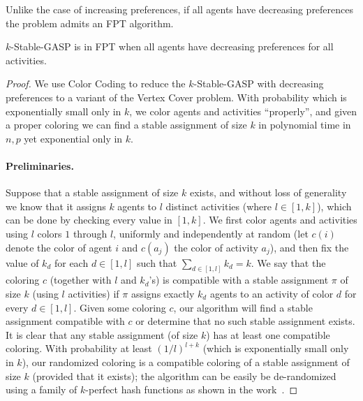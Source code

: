 Unlike the case of increasing preferences, if all agents have decreasing preferences the problem admits an FPT algorithm. 

\begin{theorem} \label{GASP:thm:stable_fpt_dec}
$k$-Stable-GASP is in FPT when all agents have decreasing preferences for all activities.
\end{theorem}
\begin{proof}
We use Color Coding to reduce the $k$-Stable-GASP with decreasing preferences to a variant of the Vertex Cover problem.
With probability which is exponentially small only in $k$, we color agents and activities ``properly'', and given a proper coloring we can find a stable assignment of size $k$ in polynomial time in $n,p$ yet exponential only in $k$. 

\paragraph{Preliminaries.}
Suppose that a stable assignment of size $k$ exists, and without loss of generality we know that it assigns $k$ agents to $l$ distinct activities (where $l \in [1, k]$), which can be done by checking every value in $[1,k]$. 
We first color agents and activities using $l$ colors $1$ through $l$, uniformly and independently at random (let $c(i)$ denote the color of agent $i$ and $c(a_j)$ the color of activity $a_j$), and then fix the value of $k_d$ for each $d\in[1, l]$ such that $\sum_{d\in[1,l]} k_d = k$. We say that the coloring $c$ (together with $l$ and $k_d$'s) is compatible with a stable assignment $\pi$ of size $k$ (using $l$ activities) if $\pi$ assigns exactly $k_d$ agents to an activity of color $d$ for every $d\in [1, l]$. Given some coloring $c$, our algorithm will find a stable assignment compatible with $c$ or determine that no such stable assignment exists. 
It is clear that any stable assignment (of size $k$) has at least one compatible coloring. 
With probability at least $(1/l)^{l+k}$ (which is exponentially small only in $k$), our randomized coloring is a compatible coloring of a stable assignment of size $k$ (provided that it exists); the algorithm can be  easily be de-randomized using a family of $k$-perfect hash functions as shown in the work~\cite{ColorCoding}. 


\end{proof}
